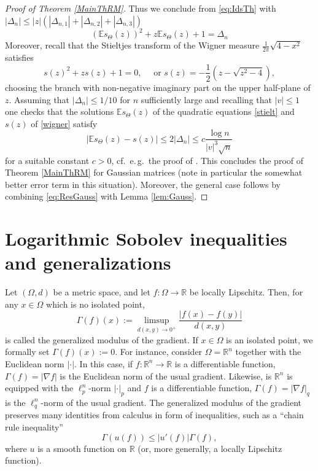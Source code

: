 \documentclass[a4paper,12pt]{amsart}
\numberwithin{equation}{section}
\theoremstyle{remark}
\def\E{{\mathbb E}}
\def\R{{\mathbb R}}
\begin{document}
\begin{proof}[Proof of Theorem \ref{MainThRM}]
Thus we conclude from \eqref{eq:IdsTh} with $|\Delta_n|  \le  |z| (|\Delta_{n,1}| + |\Delta_{n,2}| + |\Delta_{n,3}|)$
\begin{equation}
(\E s_\Theta(z))^2  + z\E s_\Theta(z) +1 = \Delta_n   \label{stielt}
\end{equation} 
Moreover, recall that the Stieltjes transform of the Wigner measure $\frac {1} {2\pi} {\sqrt{ 4 -x^2}}$ satisfies
\begin{equation}
 s(z)^2 + z s(z) +1 =0 , \quad  \text{ or } s(z)= -\frac 1 2(z-\sqrt{z^2-4}),  \label{wigner} 
\end{equation}
choosing the branch with non-negative imaginary part on the upper half-plane of $z$. Assuming that $|\Delta_n| \le 1/10 $ for $n$ sufficiently large and recalling that $|v| \le 1$ one checks that the  solutions $\E s_\Theta(z)$ of the quadratic equations \eqref{stielt} and $s(z)$ of \eqref{wigner} satisfy
\begin{equation}\label{eq:ResGauss}
|\E s_\Theta(z) - s(z)|  \le   2 |\Delta_n| \le c \frac{\log n}{|v|^3\sqrt{n}}
\end{equation}
for a suitable constant $c > 0$, cf.\ e.\,g.\ the proof of \cite[Th.\ 2.3]{CG13}. This concludes the proof of Theorem \ref{MainThRM} for Gaussian matrices (note in particular the somewhat better error term in this situation). Moreover, the general case follows by combining \eqref{eq:ResGauss} with Lemma \ref{lem:Gauss}.
\end{proof}

\section{Logarithmic Sobolev inequalities and generalizations}\label{LSqRn}

Let $(\Omega,d)$ be a metric space, and let $f \colon \Omega \to \R$ be locally Lipschitz. Then, for any $x \in \Omega$ which is no isolated point,
\begin{equation}
\label{generalizedmodulus}
\Gamma(f)(x) := \limsup_{d(x,y) \to 0^+} \frac{|f(x)-f(y)|}{d(x,y)}
\end{equation}
is called the generalized modulus of the gradient. If $x\in\Omega$ is an isolated point, we formally set $\Gamma(f)(x):=0$. For instance, consider $\Omega=\R^n$ together with the Euclidean norm $|\cdot|$. In this case, if $f \colon \R^n \to \R$ is a differentiable function, $\Gamma(f) = |\nabla f|$ is the Euclidean norm of the usual gradient. Likewise, is $\R^n$ is equipped with the $\ell_p^n$-norm $|\cdot|_p$ and $f$ is a differentiable function, $\Gamma(f) = |\nabla f|_q$ is the $\ell_q^n$-norm of the usual gradient. The generalized modulus of the gradient preserves many identities from calculus in form of inequalities, such as a ``chain rule inequality''
\begin{equation}
\label{chainrule}
\Gamma (u(f)) \le |u'(f)|\Gamma(f),
\end{equation}
where $u$ is a smooth function on $\R$ (or, more generally, a locally Lipschitz function).
\end{document}
